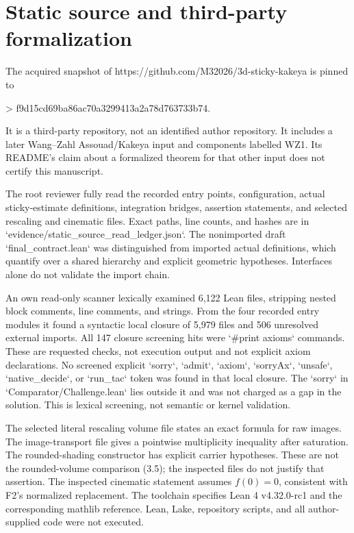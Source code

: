 \documentclass[10pt]{article}
\begin{document}
\section*{Static source and third-party formalization}
The acquired snapshot of https://github.com/M32026/3d-sticky-kakeya is pinned to\par
> f9d15cd69ba86ac70a3299413a2a78d763733b74.\par
It is a third-party repository, not an identified author repository. It includes a later Wang–Zahl Assouad/Kakeya input and components labelled WZ1. Its README’s claim about a formalized theorem for that other input does not certify this manuscript.\par
The root reviewer fully read the recorded entry points, configuration, actual sticky-estimate definitions, integration bridges, assertion statements, and selected rescaling and cinematic files. Exact paths, line counts, and hashes are in `evidence/static\_source\_read\_ledger.json`. The nonimported draft `final\_contract.lean` was distinguished from imported actual definitions, which quantify over a shared hierarchy and explicit geometric hypotheses. Interfaces alone do not validate the import chain.\par
An own read-only scanner lexically examined 6,122 Lean files, stripping nested block comments, line comments, and strings. From the four recorded entry modules it found a syntactic local closure of 5,979 files and 506 unresolved external imports. All 147 closure screening hits were `\#print axioms` commands. These are requested checks, not execution output and not explicit axiom declarations. No screened explicit `sorry`, `admit`, `axiom`, `sorryAx`, `unsafe`, `native\_decide`, or `run\_tac` token was found in that local closure. The `sorry` in `Comparator/Challenge.lean` lies outside it and was not charged as a gap in the solution. This is lexical screening, not semantic or kernel validation.\par
The selected literal rescaling volume file states an exact formula for raw images. The image-transport file gives a pointwise multiplicity inequality after saturation. The rounded-shading constructor has explicit carrier hypotheses. These are not the rounded-volume comparison (3.5); the inspected files do not justify that assertion. The inspected cinematic statement assumes \(f(0)=0\), consistent with F2’s normalized replacement. The toolchain specifies Lean 4 v4.32.0-rc1 and the corresponding mathlib reference. Lean, Lake, repository scripts, and all author-supplied code were not executed.\par
\end{document}
